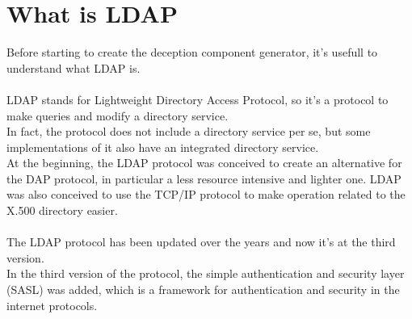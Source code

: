 \chapter{What is LDAP}
Before starting to create the deception component generator, it's usefull to understand what LDAP is.
\\\\
LDAP \cite{ldap} stands for Lightweight Directory Access Protocol, so it’s a protocol to make queries and modify a directory service.  
\\
In fact, the protocol does not include a directory service per se, but some implementations of it also have an integrated directory service. 
\\
At the beginning, the LDAP protocol was conceived to create an alternative for the DAP protocol, in particular a less resource intensive and lighter one. LDAP was also conceived to use the TCP/IP protocol to make operation related to the X.500 directory easier.  
\\\\
The LDAP protocol has been updated over the years and now it’s at the third version. 
\\
In the third version of the protocol, the simple authentication and security layer (SASL) was added, which is a framework for authentication and security in the internet protocols. 
